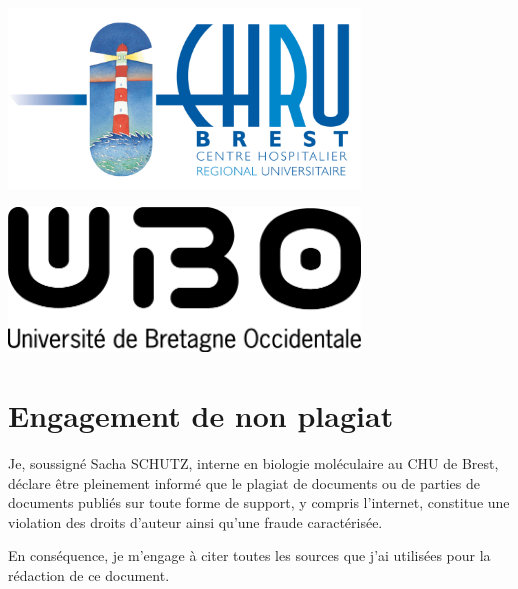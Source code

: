 \documentclass[12pt,a4paper]{article}
\begin{document}
\begin{titlepage}
\begin{minipage}[c]{0.3\textwidth}
   \includegraphics[width=0.7\textwidth]{img/logo_brest.jpg}\hfill
\end{minipage}
\begin{minipage}[c]{0.3\textwidth}
   \includegraphics[width=0.7\textwidth]{img/ubo.png}
\end{minipage}
% 
 
 
 
\vfill %

\end{titlepage}



\newpage

\section*{Engagement de non plagiat}

Je, soussigné Sacha SCHUTZ, interne en biologie moléculaire au CHU de Brest, déclare être pleinement informé que le plagiat de
documents ou de parties de documents publiés sur toute forme de
support, y compris l'internet, constitue une violation des droits
d'auteur ainsi qu'une fraude caractérisée.

En conséquence, je m'engage à citer toutes les sources que j'ai
utilisées pour la rédaction de ce document.
\end{document}
